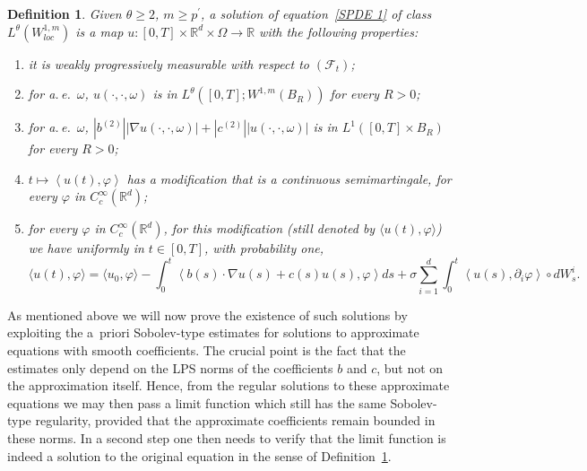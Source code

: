 \documentclass[a4paper,10pt]{article}
\newtheorem{definition}[theorem]{Definition}
\begin{document}
\begin{definition}
\label{Defin regular solutions}Given $\theta\geq2$, $m\geq p^{\prime}$, a
solution of equation~\eqref{SPDE 1} of class $L^{\theta}(  W_{loc} 
^{1,m})  $ is a map $u:[0,T]\times\mathbb{R}^{d}\times\Omega
\rightarrow\mathbb{R}$ with the following properties:

\begin{enumerate}
\item it is weakly progressively measurable with respect to $(
\mathcal{F}_{t})  $;

\item for a.\,e.\ $\omega$, $u(\cdot,\cdot,\omega)$ is in $L^{\theta
}([0,T];W^{1,m}(B_{R}))$ for every $R>0$;

\item for a.\,e.\ $\omega$, $|b^{(2)}| |\nabla u(\cdot,\cdot,\omega)|+|c^{(2)}||u(\cdot,\cdot,\omega)|$ is in $L^1([0,T]\times B_R)$ for every $R>0$;

\item\label{strat1} $t\mapsto\left\langle u(t)  ,\varphi\right\rangle $ has a
modification that is a continuous semimartingale, for every $\varphi$ in
$C_{c}^{\infty}(\mathbb{R}^{d})$;

\item\label{strat2} for every $\varphi$ in $C_{c}^{\infty}(\mathbb{R}^{d})$, for this
modification (still denoted by $\langle u(  t)  ,\varphi\rangle$)
we have uniformly in $t\in[  0,T]  $, with probability one,
\begin{equation}
\langle u(  t)  ,\varphi\rangle=\langle u_{0},\varphi\rangle
-\int_{0}^{t}\left\langle b(  s)  \cdot\nabla u(  s)
+c(  s)  u(  s)  ,\varphi\right\rangle ds+\sigma
\sum_{i=1}^{d}\int_{0}^{t}\left\langle u(  s)  ,\partial_{i} 
\varphi\right\rangle \circ dW_{s}^{i}.\label{SPDEdiff} 
\end{equation}

\end{enumerate}
\end{definition}

As mentioned above we will now prove the existence of such solutions by exploiting the a~priori Sobolev-type estimates for solutions to approximate equations with smooth coefficients. The crucial point is the fact that the estimates only depend on the LPS norms of the coefficients $b$ and $c$, but not on the approximation itself. Hence, from the regular solutions to these approximate equations we may then pass a limit function which still has the same Sobolev-type regularity, provided that the approximate coefficients remain bounded in these norms. In a second step one then needs to verify that the limit function is indeed a solution to the original equation in the sense of Definition~\ref{Defin regular solutions}. 
\end{document}
